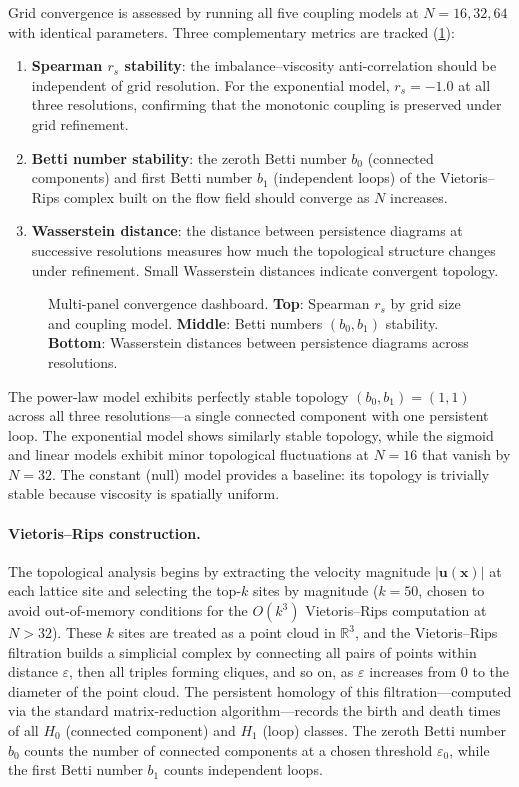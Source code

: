 \documentclass[12pt,openany]{report}
\theoremstyle{definition}
\theoremstyle{plain}
\theoremstyle{remark}
\begin{document}
Grid convergence is assessed by running all five coupling models at
$N = 16, 32, 64$ with identical parameters.  Three complementary
metrics are tracked (\cref{fig:convergence}):
\begin{enumerate}
  \item \textbf{Spearman $r_s$ stability}: the imbalance--viscosity
    anti-correlation should be independent of grid resolution.  For the
    exponential model, $r_s = -1.0$ at all three resolutions, confirming
    that the monotonic coupling is preserved under grid refinement.
  \item \textbf{Betti number stability}: the zeroth Betti number $b_0$
    (connected components) and first Betti number $b_1$ (independent
    loops) of the Vietoris--Rips complex built on the flow field should
    converge as $N$ increases.
  \item \textbf{Wasserstein distance}: the distance between persistence
    diagrams at successive resolutions measures how much the topological
    structure changes under refinement.  Small Wasserstein distances
    indicate convergent topology.
\end{enumerate}

\begin{figure}[htbp]
\centering

\caption{Multi-panel convergence dashboard.  \textbf{Top}: Spearman
$r_s$ by grid size and coupling model.  \textbf{Middle}: Betti numbers
$(b_0, b_1)$ stability.  \textbf{Bottom}: Wasserstein distances between
persistence diagrams across resolutions.}
\label{fig:convergence}
\end{figure}

The power-law model exhibits perfectly stable topology
$(b_0, b_1) = (1, 1)$ across all three resolutions---a single connected
component with one persistent loop.  The exponential model shows
similarly stable topology, while the sigmoid and linear models exhibit
minor topological fluctuations at $N = 16$ that vanish by $N = 32$.
The constant (null) model provides a baseline: its topology is trivially
stable because viscosity is spatially uniform.

\paragraph{Vietoris--Rips construction.}
The topological analysis begins by extracting the velocity magnitude
$|\mathbf{u}(\mathbf{x})|$ at each lattice site and selecting the
top-$k$ sites by magnitude ($k = 50$, chosen to avoid out-of-memory
conditions for the $O(k^3)$ Vietoris--Rips computation at $N > 32$).
These $k$ sites are treated as a point cloud in $\mathbb{R}^3$, and
the Vietoris--Rips filtration builds a simplicial complex by
connecting all pairs of points within distance $\varepsilon$, then
all triples forming cliques, and so on, as $\varepsilon$ increases
from 0 to the diameter of the point cloud.  The persistent homology
of this filtration---computed via the standard matrix-reduction
algorithm---records the birth and death times of all $H_0$ (connected
component) and $H_1$ (loop) classes.  The zeroth Betti number $b_0$
counts the number of connected components at a chosen threshold
$\varepsilon_0$, while the first Betti number $b_1$ counts independent
loops.
\end{document}
